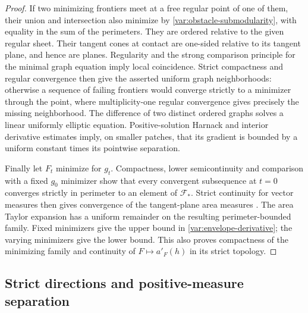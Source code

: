 \begin{proof}
If two minimizing frontiers meet at a free regular point of one of
them, their union and intersection also minimize by
\eqref{var:obstacle-submodularity}, with equality in the sum of the
perimeters.  They are ordered relative to the given regular sheet.
Their tangent cones at contact are one-sided relative to its tangent
plane, and hence are planes.  Regularity and the strong comparison
principle for the minimal graph equation imply local coincidence.
Strict compactness and regular convergence then give the asserted
uniform graph neighborhoods: otherwise a sequence of failing
frontiers would converge strictly to a minimizer through the point,
where multiplicity-one regular convergence gives precisely the
missing neighborhood.  The difference of two distinct ordered
graphs solves a linear uniformly elliptic equation.  Positive-solution
Harnack and interior derivative estimates imply, on smaller patches,
that its gradient is bounded by a uniform constant times its
pointwise separation.

Finally let $F_t$ minimize for $g_t$.  Compactness, lower
semicontinuity and comparison with a fixed $g_0$ minimizer show that
every convergent subsequence at $t=0$ converges strictly in perimeter
to an element of $\mathcal F_*$.  Strict continuity for vector
measures then gives convergence of the tangent-plane area measures
\cite{AmbrosioFuscoPallara2000}.  The area Taylor expansion has a
uniform remainder on the resulting perimeter-bounded family.  Fixed
minimizers give the upper bound in
\eqref{var:envelope-derivative}; the varying minimizers give the lower
bound.  This also proves compactness of the minimizing family and
continuity of $F\mapsto a'_F(h)$ in its strict topology.
\end{proof}

\subsection{Strict directions and positive-measure separation}

